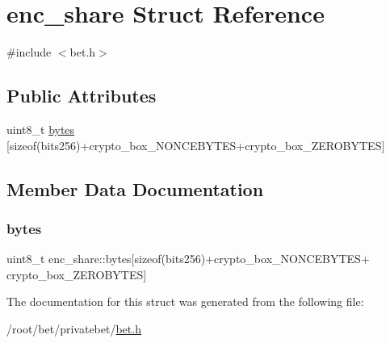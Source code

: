 \hypertarget{structenc__share}{}\section{enc\+\_\+share Struct Reference}
\label{structenc__share}


{\ttfamily \#include $<$bet.\+h$>$}

\subsection*{Public Attributes}
\begin{DoxyCompactItemize}
\item 
uint8\+\_\+t \hyperlink{structenc__share_a4bac0ffac6bcc7a207ef17db51b8c471}{bytes} \mbox{[}sizeof(bits256)+crypto\+\_\+box\+\_\+\+N\+O\+N\+C\+E\+B\+Y\+T\+ES+crypto\+\_\+box\+\_\+\+Z\+E\+R\+O\+B\+Y\+T\+ES\mbox{]}
\end{DoxyCompactItemize}


\subsection{Member Data Documentation}
\mbox{\label{structenc__share_a4bac0ffac6bcc7a207ef17db51b8c471}} 
\subsubsection{\texorpdfstring{bytes}{bytes}}
{\footnotesize\ttfamily uint8\+\_\+t enc\+\_\+share\+::bytes\mbox{[}sizeof(bits256)+crypto\+\_\+box\+\_\+\+N\+O\+N\+C\+E\+B\+Y\+T\+ES+ crypto\+\_\+box\+\_\+\+Z\+E\+R\+O\+B\+Y\+T\+ES\mbox{]}}



The documentation for this struct was generated from the following file\+:\begin{DoxyCompactItemize}
\item 
/root/bet/privatebet/\hyperlink{bet_8h}{bet.\+h}\end{DoxyCompactItemize}
